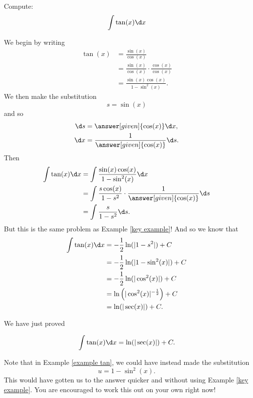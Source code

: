 \documentclass{ximera}
\begin{document}

\begin{example}\label{example tan}
Compute:
\[
\int \tan(x) \d x
\]
\begin{explanation}
We begin by writing
\begin{align*}
\tan(x) &= \frac{\sin(x)}{\cos(x)}  \\
&= \frac{\sin(x)}{\cos(x)} \cdot \frac{\cos(x)}{\cos(x)}  \\
&= \frac{\sin(x) \cos(x)}{1 - \sin^2(x)}.
\end{align*}
We then make the substitution
\[
s = \sin(x)
\]
and so
\begin{align*}
\d s &= \answer[given]{\cos(x)} \d x,\\
\d x &= \frac{1}{\answer[given]{\cos(x)}} \d s.
\end{align*}
Then
\begin{align*}
\int \tan(x) \d x &= \int \frac{\sin(x) \cos(x)}{1 - \sin^2(x)} \d x  \\
&= \int \frac{s \cos(x)}{1 - s^2} \cdot \frac{1}{\answer[given]{\cos(x)}} \d s  \\
&= \int \frac{s}{1-s^2} \d s.
\end{align*}
But this is the same problem as Example \ref{key example}!  
And so we know that
\begin{align*}
\int \tan(x) \d x &= - \frac{1}{2} \ln(|1-s^2|) + C  \\
&= - \frac{1}{2} \ln(|1-\sin^2 (x)|) + C  \\
&= - \frac{1}{2} \ln(|\cos^2(x)|) + C  \\
&= \ln\left(|\cos^2(x)|^{- \frac{1}{2}}\right) + C  \\
&= \ln(|\sec(x)|) + C.
\end{align*}
\end{explanation}
\end{example}

We have just proved

\begin{theorem}
\[
\int \tan(x) \d x = \ln(|\sec(x)|) + C.
\]
\end{theorem}

Note that in Example \ref{example tan}, we could have instead made the substitution
\[
u = 1-\sin^2(x).
\]
This would have gotten us to the answer quicker and without using Example \ref{key example}.  
You are encouraged to work this out on your own right now!
\end{document}
